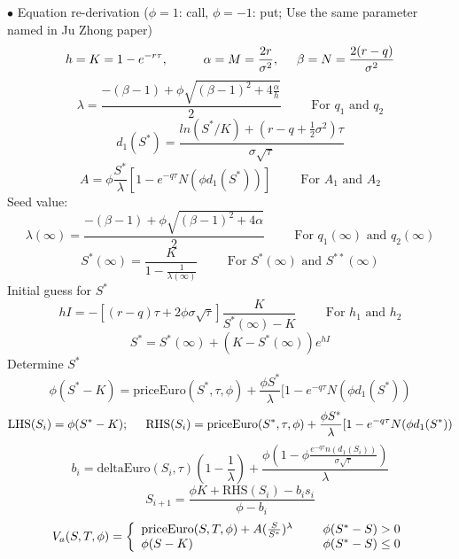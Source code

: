 \documentclass[preprint,12pt,1p]{elsarticle}
\begin{document}
\begin{spacing}{1.3}
$\bullet$ Equation re-derivation ($\phi = 1$: call, $\phi = -1$: put; Use the same parameter named in Ju Zhong paper)\\[6pt]
$$h =  K = 1-e^{-r\tau}, \hspace{1cm} \alpha = M = \frac{2r}{\sigma^2}, \hspace{0.5cm} \beta = N = \frac{2(r-q)}{\sigma^2}$$
$$\lambda = \frac{-(\beta-1) + \phi \sqrt{(\beta-1)^2 + 4\frac{\alpha}{h}}}{2} \hspace{1cm} \text{For } q_1 \text{ and } q_2 $$
$$d_1(S^*) = \frac{ln(S^*/K) + (r-q+\frac{1}{2} \sigma^2) \tau}{\sigma \sqrt{\tau}}$$
$$A = \phi \frac{S^*}{\lambda} \left[ 1 - e^{-q\tau} N(\phi d_1(S^*)) \right] \hspace{1cm} \text{For } A_1 \text{ and } A_2 $$
Seed value:\\
$$\lambda(\infty) = \frac{-(\beta-1) + \phi \sqrt{(\beta-1)^2 + 4\alpha}}{2} \hspace{1cm} \text{For } q_1(\infty) \text{ and } q_2(\infty) $$
$$S^*(\infty) = \frac{K}{1 - \frac{1}{\lambda(\infty)}}  \hspace{1cm} \text{For } S^*(\infty) \text{ and } S^{**}(\infty) $$
Initial guess for $S^*$\\
$$ hI = - [ (r-q)\tau + 2\phi \sigma \sqrt{\tau} ]\frac{K}{S^*(\infty) -K} \hspace{1cm} \text{For } h_1 \text{ and } h_2 $$
$$ S^* = S^*(\infty) + (K - S^*(\infty))e^{hI}$$
Determine $S^*$\\
$$ \phi  (S^* - K) = \text{priceEuro}(S^*, \tau, \phi)  + \frac{\phi S^*}{\lambda}[1 - e^{-q\tau} N(\phi d_1(S^*))$$
$$\text{LHS}(S_i) = \phi  (S^* - K); \hspace{0.5cm} \text{RHS}(S_i) =\text{priceEuro}(S^*, \tau, \phi)  + \frac{\phi S^*}{\lambda}[1 - e^{-q\tau} N(\phi d_1(S^*))$$
$$b_i = \text{deltaEuro}(S_i, \tau)(1-\frac{1}{\lambda}) + \frac{\phi  (1 - \phi \frac{e^{-q\tau} n(d_1(S_i))}{\sigma \sqrt{\tau}})}{\lambda}$$
$$S_{i+1} = \frac{\phi K + \text{RHS}(S_i) - b_i s_i}{\phi-  b_i}$$
\[   V_a(S, T, \phi) = \left\{ 
\begin{array}{ll}
      \text{priceEuro}(S, T, \phi) + A(\frac{S}{S^*} )^{\lambda} & \hspace{0.5cm}  \phi(S^* - S) > 0\\
      \phi(S-K) & \hspace{0.5cm}  \phi(S^* - S) \leq 0\\
\end{array} 
\right. \]\\[6pt]
\end{spacing}
\end{document}
